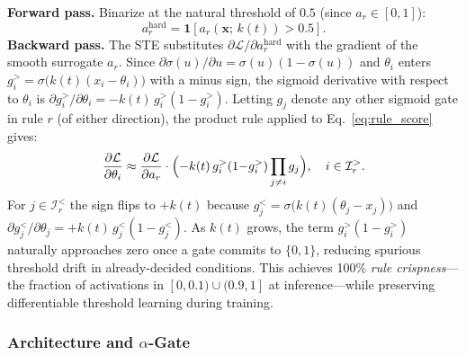 \documentclass[conference]{IEEEtran}
\begin{document}
\noindent\textbf{Forward pass.} Binarize at the natural threshold of $0.5$
(since $a_r\in[0,1]$):
\begin{equation}
  a_r^{\mathrm{hard}} = \mathbf{1}[a_r(\mathbf{x};\,k(t)) > 0.5].
  \label{eq:ste_fwd}
\end{equation}
\noindent\textbf{Backward pass.} The STE substitutes
$\partial\mathcal{L}/\partial a_r^{\mathrm{hard}}$ with the gradient of
the smooth surrogate $a_r$. Since
$\partial\sigma(u)/\partial u = \sigma(u)(1{-}\sigma(u))$ and $\theta_i$
enters $g_i^{>}{=}\sigma\!\bigl(k(t)(x_i{-}\theta_i)\bigr)$ with a minus
sign, the sigmoid derivative with respect to $\theta_i$ is
$\partial g_i^{>}/\partial\theta_i = -k(t)\,g_i^{>}(1{-}g_i^{>})$.
Letting $g_j$ denote any other sigmoid gate in rule $r$ (of either
direction), the product rule applied to Eq.~\ref{eq:rule_score} gives:
\begin{equation}
  \frac{\partial \mathcal{L}}{\partial \theta_i} \approx
    \frac{\partial \mathcal{L}}{\partial a_r} \cdot
    \Bigl(-k(t)\,g_i^{>}(1{-}g_i^{>})\prod_{j \neq i} g_j\Bigr),
    \quad i\in\mathcal{I}_r^{>}.
  \label{eq:ste_bwd}
\end{equation}
For $j\in\mathcal{I}_r^{<}$ the sign flips to $+k(t)$ because
$g_j^{<}{=}\sigma\!\bigl(k(t)(\theta_j{-}x_j)\bigr)$ and
$\partial g_j^{<}/\partial\theta_j{=}+k(t)\,g_j^{<}(1{-}g_j^{<})$.
As $k(t)$ grows, the term $g_i^{>}(1{-}g_i^{>})$ naturally approaches
zero once a gate commits to $\{0,1\}$, reducing spurious threshold
drift in already-decided conditions. This achieves 100\% \emph{rule
crispness}---the fraction of activations in $[0,0.1)\cup(0.9,1]$ at
inference---while preserving differentiable threshold learning during
training.

\subsubsection{Architecture and \texorpdfstring{$\alpha$}{alpha}-Gate}
\end{document}

